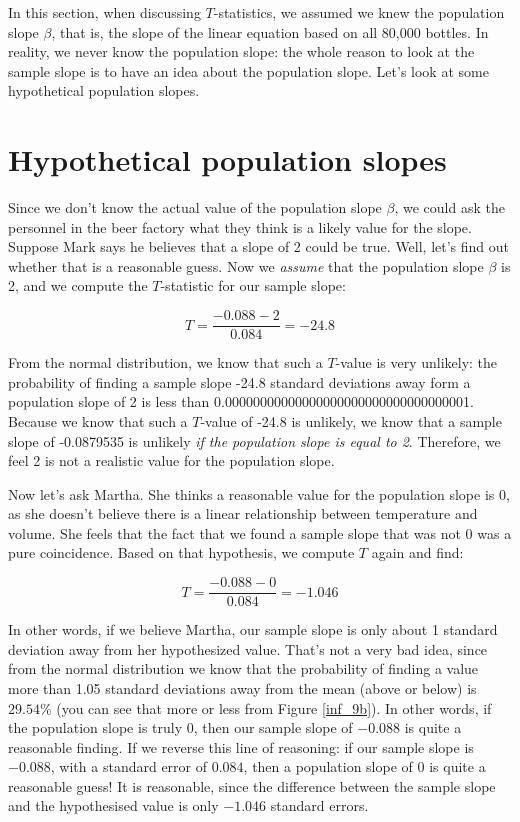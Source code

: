 \documentclass[]{book}\usepackage[]{graphicx}\usepackage[]{color}
\begin{document}
In this section, when discussing $T$-statistics, we assumed we knew the population slope $\beta$, that is, the slope of the linear equation based on all 80,000 bottles. In reality, we never know the population slope: the whole reason to look at the sample slope is to have an idea about the population slope. Let's look at some hypothetical population slopes.





\section{Hypothetical population slopes}


Since we don't know the actual value of the population slope $\beta$, we could ask the personnel in the beer factory what they think is a likely value for the slope. Suppose Mark says he believes that a slope of 2 could be true. Well, let's find out whether that is a reasonable guess. Now we \textit{assume} that the population slope $\beta$ is 2, and we compute the $T$-statistic for our sample slope:



\begin{equation}
T = \frac{-0.088-2}{0.084}= -24.8
\end{equation}

From the normal distribution, we know that such a $T$-value is very unlikely: the probability of finding a sample slope -24.8 standard deviations away form a population slope of 2 is less than 0.00000000000000000000000000000000001. Because we know that such a $T$-value of -24.8 is unlikely, we know that a sample slope of -0.0879535 is unlikely \textit{if the population slope is equal to 2}. Therefore, we feel 2 is not a realistic value for the population slope.


Now let's ask Martha. She thinks a reasonable value for the population slope is 0, as she doesn't believe there is a linear relationship between temperature and volume. She feels that the fact that we found a sample slope that was not 0 was a pure coincidence. Based on that hypothesis, we compute $T$ again and find:


\begin{equation}
T = \frac{-0.088-0}{0.084}= -1.046
\end{equation}

In other words, if we believe Martha, our sample slope is only about 1 standard deviation away from her hypothesized value. That's not a very bad idea, since from the normal distribution we know that the probability of finding a value more than 1.05 standard deviations away from the mean (above or below) is $29.54$\% (you can see that more or less from Figure \ref{inf_9b}). In other words, if the population slope is truly 0, then our sample slope of $-0.088$ is quite a reasonable finding. If we reverse this line of reasoning: if our sample slope is $-0.088$, with a standard error of $0.084$, then a population slope of 0 is quite a reasonable guess! It is reasonable, since the difference between the sample slope and the hypothesised value is only $-1.046$ standard errors.
\end{document}
